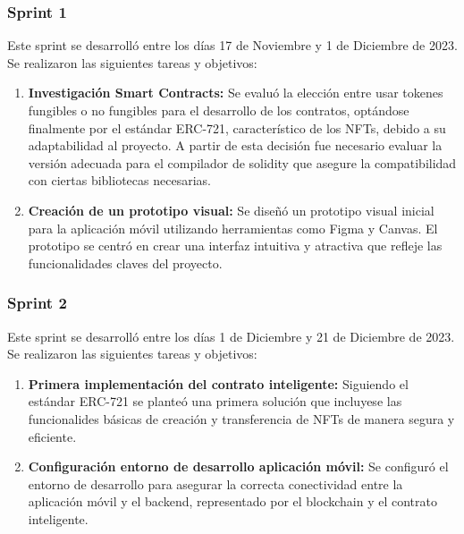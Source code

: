 \subsubsection{Sprint 1}

Este sprint se desarrolló entre los días 17 de Noviembre y 1 de Diciembre de 2023. Se realizaron las siguientes tareas y objetivos:

\begin{enumerate}

\item \textbf{Investigación Smart Contracts:} Se evaluó la elección entre usar tokenes fungibles o no fungibles para el desarrollo de los contratos, optándose finalmente por el estándar ERC-721, característico de los NFTs, debido a su adaptabilidad al proyecto.
A partir de esta decisión fue necesario evaluar la versión adecuada para el compilador de solidity que asegure la compatibilidad con ciertas bibliotecas necesarias.

\item \textbf{Creación de un prototipo visual:} Se diseñó un prototipo visual inicial para la aplicación móvil utilizando herramientas como Figma y Canvas.
El prototipo se centró en crear una interfaz intuitiva y atractiva que refleje las funcionalidades claves del proyecto.

\end{enumerate}


\subsubsection{Sprint 2}

Este sprint se desarrolló entre los días 1 de Diciembre y 21 de Diciembre de 2023. Se realizaron las siguientes tareas y objetivos:

\begin{enumerate}

\item \textbf{Primera implementación del contrato inteligente:} Siguiendo el estándar ERC-721 se planteó una primera solución que incluyese las funcionalides básicas de creación y transferencia de NFTs de manera segura y eficiente.

\item \textbf{Configuración entorno de desarrollo aplicación móvil:} Se configuró el entorno de desarrollo para asegurar la correcta conectividad entre la aplicación móvil y el backend, representado por el blockchain y el contrato inteligente.


\end{enumerate}


